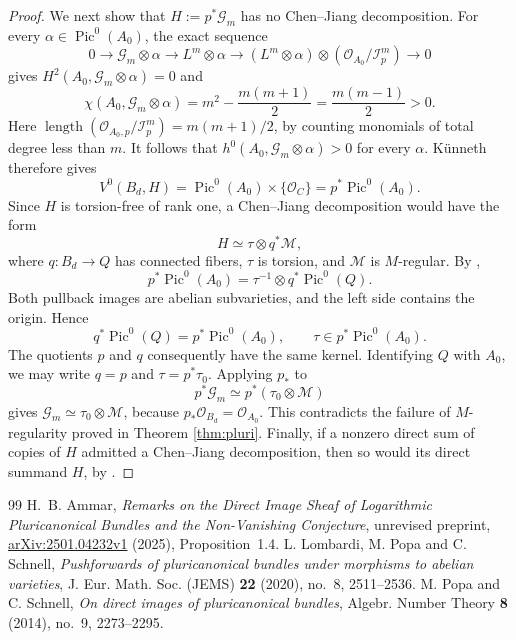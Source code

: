 \documentclass[10pt,a4paper]{amsart}
\newcommand{\OO}{\mathcal O}
\newcommand{\GG}{\mathcal G}
\newcommand{\II}{\mathcal I}
\DeclareMathOperator{\Pic}{Pic}
\DeclareMathOperator{\length}{length}
\begin{document}
\begin{proof}
We next show that $H:=p^*\GG_m$ has no Chen--Jiang decomposition. For every $\alpha\in\Pic^0(A_0)$, the exact sequence
\[
0\longrightarrow\GG_m\otimes\alpha\longrightarrow L^m\otimes\alpha
\longrightarrow(L^m\otimes\alpha)\otimes(\OO_{A_0}/\II_p^m)\longrightarrow0
\]
gives $H^2(A_0,\GG_m\otimes\alpha)=0$ and
\[
\chi(A_0,\GG_m\otimes\alpha)
=m^2-\frac{m(m+1)}2=\frac{m(m-1)}2>0.
\]
Here $\length(\OO_{A_0,p}/\II_p^m)=m(m+1)/2$, by counting monomials of total degree less than $m$. It follows that $h^0(A_0,\GG_m\otimes\alpha)>0$ for every $\alpha$. K\"unneth therefore gives
\[
V^0(B_d,H)=\Pic^0(A_0)\times\{\OO_C\}=p^*\Pic^0(A_0).
\]
Since $H$ is torsion-free of rank one, a Chen--Jiang decomposition would have the form
\[
H\simeq\tau\otimes q^*\mathcal M,
\]
where $q:B_d\to Q$ has connected fibers, $\tau$ is torsion, and $\mathcal M$ is $M$-regular. By \cite[Lemma 3.3]{LPS},
\[
p^*\Pic^0(A_0)=\tau^{-1}\otimes q^*\Pic^0(Q).
\]
Both pullback images are abelian subvarieties, and the left side contains the origin. Hence
\[
q^*\Pic^0(Q)=p^*\Pic^0(A_0),\qquad \tau\in p^*\Pic^0(A_0).
\]
The quotients $p$ and $q$ consequently have the same kernel. Identifying $Q$ with $A_0$, we may write $q=p$ and $\tau=p^*\tau_0$. Applying $p_*$ to
\[
p^*\GG_m\simeq p^*(\tau_0\otimes\mathcal M)
\]
gives $\GG_m\simeq\tau_0\otimes\mathcal M$, because $p_*\OO_{B_d}=\OO_{A_0}$. This contradicts the failure of $M$-regularity proved in Theorem \ref{thm:pluri}. Finally, if a nonzero direct sum of copies of $H$ admitted a Chen--Jiang decomposition, then so would its direct summand $H$, by \cite[Proposition 3.6]{LPS}.
\end{proof}

\begin{thebibliography}{99}
 H.~B. Ammar, \textit{Remarks on the Direct Image Sheaf of Logarithmic Pluricanonical Bundles and the Non-Vanishing Conjecture}, unrevised preprint, \href{https://arxiv.org/abs/2501.04232v1}{arXiv:2501.04232v1} (2025), Proposition~1.4.
 L. Lombardi, M. Popa and C. Schnell, \textit{Pushforwards of pluricanonical bundles under morphisms to abelian varieties}, J. Eur. Math. Soc. (JEMS) \textbf{22} (2020), no.~8, 2511--2536.
 M. Popa and C. Schnell, \textit{On direct images of pluricanonical bundles}, Algebr. Number Theory \textbf{8} (2014), no.~9, 2273--2295.
\end{thebibliography}
\end{document}
